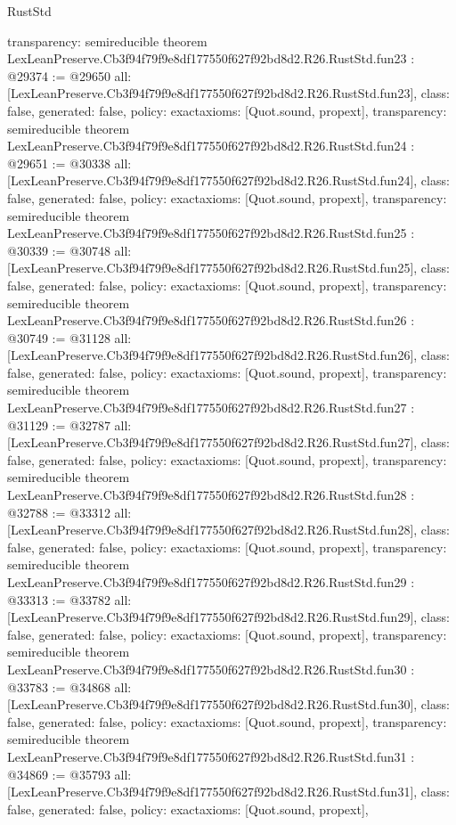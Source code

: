\begin{lexlean}{RustStd}
\begin{coremodule}
{  transparency: semireducible
}
theorem LexLeanPreserve.Cb3f94f79f9e8df177550f627f92bd8d2.R26.RustStd.fun23 : @29374 := @29650 {
  all: [LexLeanPreserve.Cb3f94f79f9e8df177550f627f92bd8d2.R26.RustStd.fun23],
  class: false,
  generated: false,
  policy: exact{axioms: [Quot.sound, propext]},
  transparency: semireducible
}
theorem LexLeanPreserve.Cb3f94f79f9e8df177550f627f92bd8d2.R26.RustStd.fun24 : @29651 := @30338 {
  all: [LexLeanPreserve.Cb3f94f79f9e8df177550f627f92bd8d2.R26.RustStd.fun24],
  class: false,
  generated: false,
  policy: exact{axioms: [Quot.sound, propext]},
  transparency: semireducible
}
theorem LexLeanPreserve.Cb3f94f79f9e8df177550f627f92bd8d2.R26.RustStd.fun25 : @30339 := @30748 {
  all: [LexLeanPreserve.Cb3f94f79f9e8df177550f627f92bd8d2.R26.RustStd.fun25],
  class: false,
  generated: false,
  policy: exact{axioms: [Quot.sound, propext]},
  transparency: semireducible
}
theorem LexLeanPreserve.Cb3f94f79f9e8df177550f627f92bd8d2.R26.RustStd.fun26 : @30749 := @31128 {
  all: [LexLeanPreserve.Cb3f94f79f9e8df177550f627f92bd8d2.R26.RustStd.fun26],
  class: false,
  generated: false,
  policy: exact{axioms: [Quot.sound, propext]},
  transparency: semireducible
}
theorem LexLeanPreserve.Cb3f94f79f9e8df177550f627f92bd8d2.R26.RustStd.fun27 : @31129 := @32787 {
  all: [LexLeanPreserve.Cb3f94f79f9e8df177550f627f92bd8d2.R26.RustStd.fun27],
  class: false,
  generated: false,
  policy: exact{axioms: [Quot.sound, propext]},
  transparency: semireducible
}
theorem LexLeanPreserve.Cb3f94f79f9e8df177550f627f92bd8d2.R26.RustStd.fun28 : @32788 := @33312 {
  all: [LexLeanPreserve.Cb3f94f79f9e8df177550f627f92bd8d2.R26.RustStd.fun28],
  class: false,
  generated: false,
  policy: exact{axioms: [Quot.sound, propext]},
  transparency: semireducible
}
theorem LexLeanPreserve.Cb3f94f79f9e8df177550f627f92bd8d2.R26.RustStd.fun29 : @33313 := @33782 {
  all: [LexLeanPreserve.Cb3f94f79f9e8df177550f627f92bd8d2.R26.RustStd.fun29],
  class: false,
  generated: false,
  policy: exact{axioms: [Quot.sound, propext]},
  transparency: semireducible
}
theorem LexLeanPreserve.Cb3f94f79f9e8df177550f627f92bd8d2.R26.RustStd.fun30 : @33783 := @34868 {
  all: [LexLeanPreserve.Cb3f94f79f9e8df177550f627f92bd8d2.R26.RustStd.fun30],
  class: false,
  generated: false,
  policy: exact{axioms: [Quot.sound, propext]},
  transparency: semireducible
}
theorem LexLeanPreserve.Cb3f94f79f9e8df177550f627f92bd8d2.R26.RustStd.fun31 : @34869 := @35793 {
  all: [LexLeanPreserve.Cb3f94f79f9e8df177550f627f92bd8d2.R26.RustStd.fun31],
  class: false,
  generated: false,
  policy: exact{axioms: [Quot.sound, propext]},
}
\end{coremodule}
\end{lexlean}
